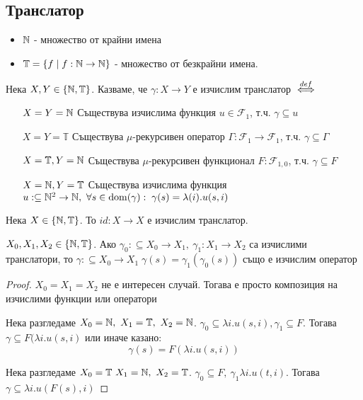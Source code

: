 \subsection{Транслатор}
\begin{itemize}
    \item ${\mathbb{N}}$ - множество от крайни имена
    \item $\mathbb T = \left\{f \mid f:{\mathbb{N}}\to{\mathbb{N}}\right\}$  - множество от безкрайни имена.
\end{itemize}
\begin{definition}
    Нека $X, Y \in \{{\mathbb{N}}, \mathbb T\}$. Казваме, че $\gamma: X \to Y$ е изчислим транслатор ${\overset{def}{\iff}}$
    \begin{itemize}
        \item[$X=Y={\mathbb{N}}$] Съществува изчислима функция $u \in \mathcal F_1$, т.ч. $\gamma \subseteq u$
        \item[$X=Y=\mathbb T$] Съществува $\mu$-рекурсивен оператор $\Gamma: \mathcal F_1 \to \mathcal F_1$, т.ч. $\gamma \subseteq \Gamma$
        \item[$X=\mathbb T, Y={\mathbb{N}}$] Съществува $\mu$-рекурсивен функционал $F: \mathcal F_{1,0}$, т.ч. $\gamma \subseteq F$
        \item[$X={\mathbb{N}}, Y=\mathbb T$] Съществува изчислима функция $u:\subseteq {\mathbb{N}}^2 \to {\mathbb{N}},\ \forall s \in \operatorname*{dom}(\gamma):\; \gamma(s) = \lambda(i). u(s, i)$
    \end{itemize}
\end{definition}
\begin{proposition}
    Нека $X \in \{{\mathbb{N}}, \mathbb T\}$. То $id: X \to X$ е изчислим транслатор.
\end{proposition}
\begin{proposition}
    $X_0, X_1, X_2 \in \{{\mathbb{N}}, \mathbb T\}$. Ако $\gamma_0: \subseteq X_0 \to X_1,\ \gamma_1: X_1 \to X_2$ са изчислими транслатори, то $\gamma: \subseteq X_0 \to X_1\; \gamma(s) = \gamma_1(\gamma_0(s))$ също е изчислим оператор
\end{proposition}
\begin{proof}
    $X_0 = X_1 = X_2$ не е интересен случай. Тогава е просто композиция на изчислими функции или оператори
    
    Нека разгледаме $X_0 = {\mathbb{N}},\ X_1 = \mathbb T,\ X_2 = {\mathbb{N}}$. $\gamma_0 \subseteq \lambda i. u(s, i), \gamma_1 \subseteq F$. Тогава $\gamma \subseteq F(\lambda i. u(s, i)$ или иначе казано:
    \begin{equation}
        \gamma(s) = F(\lambda i. u(s,i))
    \end{equation}

    Нека разгледаме $X_0 = \mathbb T\ X_1 = {\mathbb{N}},\ X_2 = \mathbb T$. $\gamma_0 \subseteq F,\ \gamma_1 \lambda i. u(t,i)$. Тогава $\gamma \subseteq \lambda i. u(F(s), i)$
\end{proof}


